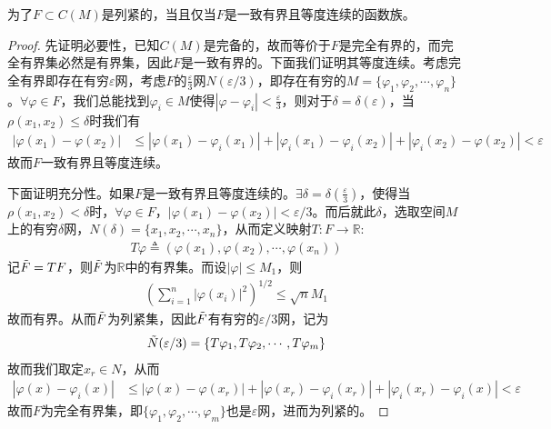 	\begin{theorem}
		为了$F\subset C(M)$是列紧的，当且仅当$F$是一致有界且等度连续的函数族。
	\end{theorem}
	\begin{proof}
		先证明必要性，已知$C(M)$是完备的，故而等价于$F$是完全有界的，而完全有界集必然是有界集，因此$F$是一致有界的。下面我们证明其等度连续。考虑完全有界即存在有穷$\varepsilon$网，考虑$F$的$\frac{\varepsilon}{3}$网$N(\varepsilon/3)$，即存在有穷的$M = \{\varphi_1,\varphi_2,\cdots,\varphi_n\}$。$\forall \varphi\in F$，我们总能找到$\varphi_i\in M$使得$|\varphi - \varphi_i| < \frac{\varepsilon}{3}$，则对于$\delta = \delta(\varepsilon)$，当$\rho(x_1,x_2)\leqslant \delta$时我们有
		\begin{align*}
			|\varphi(x_1) - \varphi(x_2)| &\leqslant |\varphi(x_1) - \varphi_i(x_1)| + |\varphi_i(x_1) - \varphi_i(x_2)| + | \varphi_i(x_2) - \varphi(x_2)| < \varepsilon
		\end{align*}
		故而$F$一致有界且等度连续。
		
		下面证明充分性。如果$F$是一致有界且等度连续的。$\exists \delta = \delta(\frac{\varepsilon}{3})$，使得当$\rho(x_1,x_2)<\delta$时，$\forall \varphi\in F$，$|\varphi(x_1) - \varphi(x_2)| < \varepsilon/3$。而后就此$\delta$，选取空间$M$上的有穷$\delta$网，$N(\delta) = \{x_1,x_2,\cdots,x_n\}$，从而定义映射$T:F\to\mathbb{R}$:
		\begin{align*}
			T\varphi \triangleq (\varphi(x_1),\varphi(x_2),\cdots,\varphi(x_n))
		\end{align*}
		记$\Tilde{F} = TF$，则$\Tilde{F}$为$\mathbb{R}$中的有界集。而设$|\varphi|\leqslant M_1$，则
		\begin{align*}
			\left( \sum\limits_{i=1}^n |\varphi(x_i)|^2 \right)^{1/2}\leqslant \sqrt{n}M_1
		\end{align*}
		故而有界。从而$\Tilde{F}$为列紧集，因此$\Tilde{F}$有有穷的$\varepsilon/3$网，记为
		\begin{align*}
			\Tilde{N}(\varepsilon/3) = \{T\varphi_1, T\varphi_2,\cdots,T\varphi_m\}
		\end{align*}
		故而我们取定$x_r\in N$，从而
		\begin{align*}
			|\varphi(x) - \varphi_i(x)| &\leqslant |\varphi(x) - \varphi(x_r)| + |\varphi(x_r) - \varphi_i(x_r)| + |\varphi_i(x_r) - \varphi_i(x)| < \varepsilon
		\end{align*}
		故而$F$为完全有界集，即$\{\varphi_1,\varphi_2,\cdots,\varphi_m\}$也是$\varepsilon$网，进而为列紧的。
	\end{proof}
	
